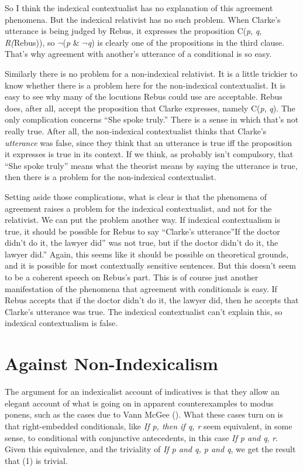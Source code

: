 \documentclass[
  11pt,
  letterpaper,
  DIV=11,
  numbers=noendperiod,
  oneside]{scrartcl}
\begin{document}
So I think the indexical contextualist has no explanation of this
agreement phenomena. But the indexical relativist has no such problem.
When Clarke's utterance is being judged by Rebus, it expresses the
proposition C(\emph{p}, \emph{q}, \emph{R(}Rebus)), so \(\neg\)(\emph{p}
\& \(\neg\)\emph{q}) is clearly one of the propositions in the third
clause. That's why agreement with another's utterance of a conditional
is so easy.

Similarly there is no problem for a non-indexical relativist. It is a
little trickier to know whether there is a problem here for the
non-indexical contextualist. It is easy to see why many of the locutions
Rebus could use are acceptable. Rebus does, after all, accept the
proposition that Clarke expresses, namely C(\emph{p}, \emph{q}). The
only complication concerns ``She spoke truly.'' There is a sense in
which that's not really true. After all, the non-indexical contextualist
thinks that Clarke's \emph{utterance} was false, since they think that
an utterance is true iff the proposition it expresses is true in its
context. If we think, as probably isn't compulsory, that ``She spoke
truly'' means what the theorist means by saying the utterance is true,
then there is a problem for the non-indexical contextualist.

Setting aside those complications, what is clear is that the phenomena
of agreement raises a problem for the indexical contextualist, and not
for the relativist. We can put the problem another way. If indexical
contextualism is true, it should be possible for Rebus to say ``Clarke's
utterance''If the doctor didn't do it, the lawyer did'' was not true,
but if the doctor didn't do it, the lawyer did.'' Again, this seems like
it should be possible on theoretical grounds, and it is possible for
most contextually sensitive sentences. But this doesn't seem to be a
coherent speech on Rebus's part. This is of course just another
manifestation of the phenomena that agreement with conditionals is easy.
If Rebus accepts that if the doctor didn't do it, the lawyer did, then
he accepts that Clarke's utterance was true. The indexical contextualist
can't explain this, so indexical contextualism is false.

\section{Against Non-Indexicalism}\label{against-non-indexicalism}

The argument for an indexicalist account of indicatives is that they
allow an elegant account of what is going on in apparent counterexamples
to modus ponens, such as the cases due to Vann McGee
(). What these cases turn on is that
right-embedded conditionals, like \emph{If p, then if q, r} seem
equivalent, in some sense, to conditional with conjunctive antecedents,
in this case \emph{If p and q}, \emph{r}. Given this equivalence, and
the triviality of \emph{If p and q, p and q}, we get the result that (1)
is trivial.
\end{document}
